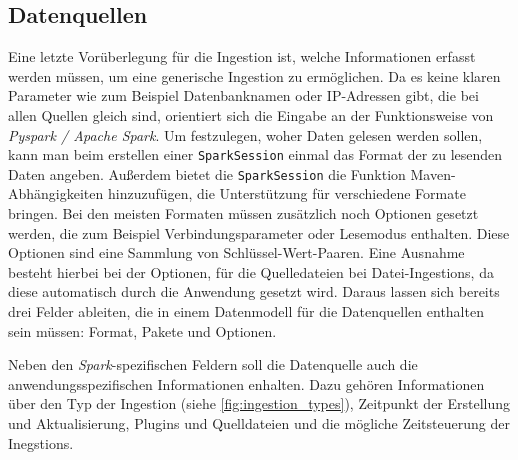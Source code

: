 \subsection{Datenquellen}
Eine letzte Vorüberlegung für die Ingestion ist, welche Informationen erfasst werden müssen, um eine generische Ingestion zu ermöglichen.
Da es keine klaren Parameter wie zum Beispiel Datenbanknamen oder IP-Adressen gibt, die bei allen Quellen gleich sind, orientiert sich die Eingabe an der Funktionsweise von \textit{Pyspark / Apache Spark}.
Um festzulegen, woher Daten gelesen werden sollen, kann man beim erstellen einer \verb|SparkSession| einmal das Format der zu lesenden Daten angeben.
Außerdem bietet die \verb|SparkSession| die Funktion Maven-Abhängigkeiten hinzuzufügen, die Unterstützung für verschiedene Formate bringen.
Bei den meisten Formaten müssen zusätzlich noch Optionen gesetzt werden, die zum Beispiel Verbindungsparameter oder Lesemodus enthalten.
Diese Optionen sind eine Sammlung von Schlüssel-Wert-Paaren.
Eine Ausnahme besteht hierbei bei der Optionen, für die Quelledateien bei Datei-Ingestions, da diese automatisch durch die Anwendung gesetzt wird.
Daraus lassen sich bereits drei Felder ableiten, die in einem Datenmodell für die Datenquellen enthalten sein müssen: Format, Pakete und Optionen.

Neben den \textit{Spark}-spezifischen Feldern soll die Datenquelle auch die anwendungsspezifischen Informationen enhalten.
Dazu gehören Informationen über den Typ der Ingestion (siehe \ref{fig:ingestion_types}), Zeitpunkt der Erstellung und Aktualisierung, Plugins und Quelldateien und die mögliche Zeitsteuerung der Inegstions.
